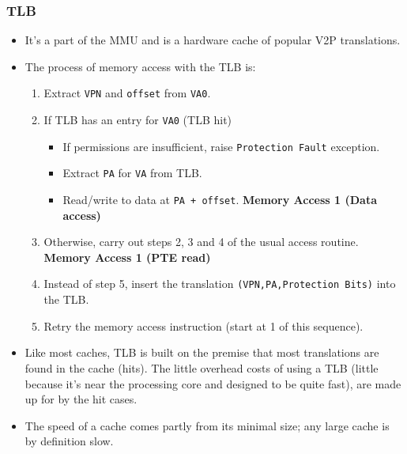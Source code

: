 \documentclass[10pt]{report}
\begin{document}
\subsubsection{TLB}
\begin{itemize}
    \item It's a part of the MMU and is a hardware cache of popular V2P translations.
    \item The process of memory access with the TLB is:
    \begin{enumerate}
    \item Extract \texttt{VPN} and \texttt{offset} from \texttt{VA0}.
    \item If TLB has an entry for \texttt{VA0} (TLB hit)
    \begin{itemize}
        \item If permissions are insufficient, raise \texttt{Protection Fault} exception.
        \item Extract \texttt{PA} for \texttt{VA} from TLB.
        \item Read/write to data at \texttt{PA + offset}. \hfill \textbf{Memory Access 1 (Data access)}
    \end{itemize}
    \item Otherwise, carry out steps 2, 3 and 4 of the usual access routine. \hfill \textbf{Memory Access 1 (PTE read)}
    \item Instead of step 5, insert the translation \texttt{(VPN,PA,Protection Bits)} into the TLB.
    \item Retry the memory access instruction (start at 1 of this sequence).
    \end{enumerate}
    \item Like most caches, TLB is built on the premise that most 
    translations are found in the cache (hits). The little overhead 
    costs of using a TLB (little because it's near the processing 
    core and designed to be quite fast), are made up for by the hit cases. 
    \item The speed of a cache comes partly from its minimal size; any large cache is by definition slow.
\end{itemize}
\end{document}
